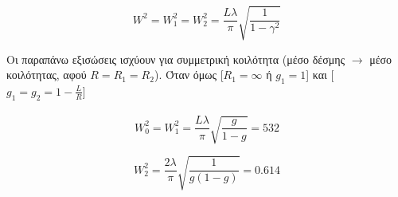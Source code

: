 \documentclass[a4paper,11pt,titlepage]{article}
\begin{document}
\begin{equation}
 W^2=W_1^2=W_2^2=\frac{L\lambda}{\pi}\sqrt{\dfrac{1}{1-\gamma^2}}
\end{equation}

Οι παραπάνω εξισώσεις ισχύουν για συμμετρική κοιλότητα (μέσο δέσμης $\rightarrow$ μέσο κοιλότητας, αφού $R=R_1=R_2$). 
Όταν όμως [$R_1=\infty$ ή $g_1=1$] και [$g_1=g_2=1-\frac{L}{R}$]
\\\\

\begin{equation} 
 W_0^2=W_1^2=\frac{L\lambda}{\pi}\sqrt{\frac{g}{1-g}}=532
\end{equation} 

\begin{equation} 
 W_2^2=\frac{2\lambda}{\pi}\sqrt{\frac{1}{g(1-g)}}=0.614
\end{equation} 









\end{document}
